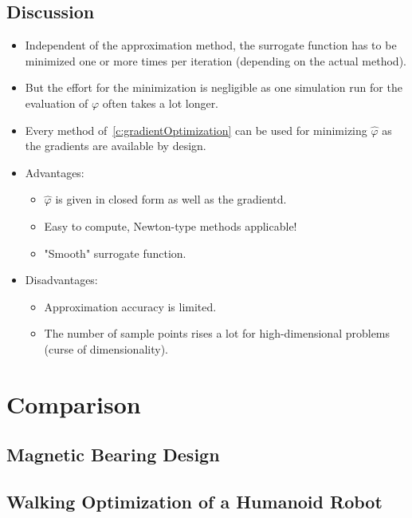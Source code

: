 		\subsection{Discussion}
			\begin{itemize}
				\item Independent of the approximation method, the surrogate function has to be minimized one or more times per iteration (depending on the actual method).
				\item But the effort for the minimization is negligible as one simulation run for the evaluation of \(\varphi\) often takes a lot longer.
				\item Every method of~\autoref{c:gradientOptimization} can be used for minimizing \(\hat{\varphi}\) as the gradients are available by design.
				\item Advantages:
					\begin{itemize}
						\item \(\hat{\varphi}\) is given in closed form as well as the gradientd.
						\item Easy to compute, Newton-type methods applicable!
						\item "Smooth" surrogate function.
					\end{itemize}
				\item Disadvantages:
					\begin{itemize}
						\item Approximation accuracy is limited.
						\item The number of sample points rises a lot for high-dimensional problems (curse of dimensionality).
					\end{itemize}
			\end{itemize}

	\section{Comparison}
		\subsection{Magnetic Bearing Design} %

		\subsection{Walking Optimization of a Humanoid Robot} %

